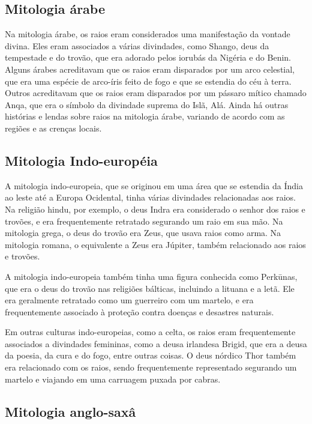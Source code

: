 \documentclass[a4paper, 12pt, onecolumn,singlespacing]{article}
\begin{document}
	\subsection{Mitologia árabe}
	
	Na mitologia árabe, os raios eram considerados uma manifestação da vontade divina. Eles eram associados a várias divindades, como Shango, deus da tempestade e do trovão, que era adorado pelos iorubás da Nigéria e do Benin. Alguns árabes acreditavam que os raios eram disparados por um arco celestial, que era uma espécie de arco-íris feito de fogo e que se estendia do céu à terra. Outros acreditavam que os raios eram disparados por um pássaro mítico chamado Anqa, que era o símbolo da divindade suprema do Islã, Alá. Ainda há outras histórias e lendas sobre raios na mitologia árabe, variando de acordo com as regiões e as crenças locais.
	
	\subsection{Mitologia Indo-européia}
	
	A mitologia indo-europeia, que se originou em uma área que se estendia da Índia ao leste até a Europa Ocidental, tinha várias divindades relacionadas aos raios. Na religião hindu, por exemplo, o deus Indra era considerado o senhor dos raios e trovões, e era frequentemente retratado segurando um raio em sua mão. Na mitologia grega, o deus do trovão era Zeus, que usava raios como arma. Na mitologia romana, o equivalente a Zeus era Júpiter, também relacionado aos raios e trovões.
	
	A mitologia indo-europeia também tinha uma figura conhecida como Perkūnas, que era o deus do trovão nas religiões bálticas, incluindo a lituana e a letã. Ele era geralmente retratado como um guerreiro com um martelo, e era frequentemente associado à proteção contra doenças e desastres naturais.
	
	Em outras culturas indo-europeias, como a celta, os raios eram frequentemente associados a divindades femininas, como a deusa irlandesa Brigid, que era a deusa da poesia, da cura e do fogo, entre outras coisas. O deus nórdico Thor também era relacionado com os raios, sendo frequentemente representado segurando um martelo e viajando em uma carruagem puxada por cabras.
	
	\subsection{Mitologia anglo-saxâ}
	
\end{document}
